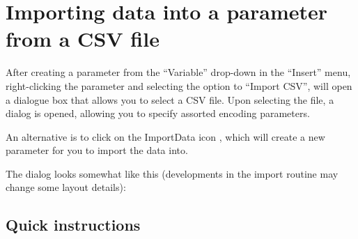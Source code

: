 \section{Importing data into a parameter from a CSV file}

\label{CSV import} \label{Operation:csvImport}

After creating a parameter from the ``Variable'' drop-down in the
``Insert'' menu, right-clicking the parameter and selecting the
option to ``Import CSV'', will open a dialogue box that allows you
to select a CSV file. Upon selecting the file, a dialog is opened,
allowing you to specify assorted encoding parameters.

An alternative is to click on the ImportData icon ,
which will create a new parameter for you to import the data into.

The dialog looks somewhat like this (developments in the import routine
may change some layout details):
\begin{center}
\par\end{center}

\subsection{Quick instructions}

